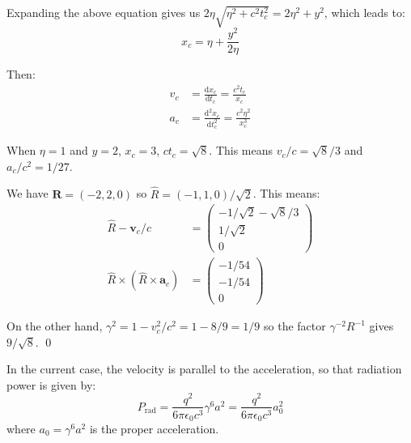 \documentclass[12pt]{article}
\begin{document}
Expanding the above equation gives us $2\eta \sqrt{\eta^{2} + c^{2} t_{c}^{2}} = 2\eta^{2} + y^{2}$, which leads to:
\begin{equation}
    x_{c} = \eta + \frac{y^{2}}{2\eta}
\end{equation}

Then:
\begin{equation}
    \begin{split}
        v_{c} &= \frac{\mathrm{d}x_{c}}{\mathrm{d}t_{c}} = \frac{c^{2} t_{c}}{x_{c}} \\
        a_{c} &= \frac{\mathrm{d}^{2}x_{c}}{\mathrm{d}t_{c}^{2}} = \frac{c^{2} \eta^{2}}{x_{c}^{3}}
    \end{split}
\end{equation}

When $\eta = 1$ and $y = 2$, $x_{c} = 3$, $c t_{c} = \sqrt{8}$. This means $v_{c}/c = \sqrt{8}/3$ and $a_{c}/c^{2} = 1/27$.

We have $\mathbf{R} = (-2, 2, 0)$ so $\hat{R} = (-1, 1, 0)/\sqrt{2}$. This means:
\begin{equation}
    \begin{split}
        \hat{R} - \mathbf{v}_{c}/c &=
        \begin{pmatrix}
            -1/\sqrt{2} - \sqrt{8}/3 \\
            1/\sqrt{2}               \\
            0
        \end{pmatrix} \\
        \hat{R} \times (\hat{R} \times \mathbf{a}_{c}) &=
        \begin{pmatrix}
            -1/54 \\
            -1/54 \\
            0
        \end{pmatrix}
    \end{split}
\end{equation}

On the other hand, $\gamma^{2} = 1 - v_{c}^{2}/c^{2} = 1 - 8/9 = 1/9$ so the factor $\gamma^{-2} R^{-1}$ gives $9/\sqrt{8}$.
\qed



In the current case, the velocity is parallel to the acceleration, so that radiation power is given by:
\begin{equation}
    P_{\text{rad}} = \frac{q^{2}}{6\pi \epsilon_{0} c^{3}} \gamma^{6} a^{2} = \frac{q^{2}}{6\pi \epsilon_{0} c^{3}} a_{0}^{2}
\end{equation}
where $a_{0} = \gamma^{6} a^{2}$ is the proper acceleration.
\end{document}
